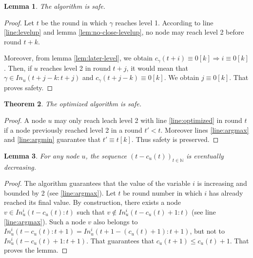 \documentclass[11pt,letterpaper]{article}
\renewcommand{\leq}{\leqslant}
\newtheorem{thm}{Theorem}
\newtheorem{lem}[thm]{Lemma}
\newcommand{\cent}{\gamma}
\begin{document}
\begin{lem}
	The algorithm is safe.
\end{lem}
\begin{proof}
	Let $t$ be the round in which $\cent$ reaches level 1.
	According to line \ref{line:levelup} and lemma \ref{lem:no-close-levelup}, no node may reach level 2 before round $t+k$.

	Moreover, from lemma \ref{lem:later-level}, we obtain $c_\cent(t+i) \equiv 0 [k] \Rightarrow i \equiv 0 [k]$.
	Then, if $u$ reaches level 2 in round $t+j$, it would mean that $\cent \in In_u(t+j-k:t+j)$ and $c_\cent(t+j-k) \equiv 0 [k]$.
	We obtain $j \equiv 0 [k]$. That proves safety.
\end{proof}

\begin{thm}
	The optimized algorithm is safe.
\end{thm}
\begin{proof}
	A node $u$ may only reach leach level 2 with line \ref{line:optimized} in round $t$ if a node previously reached level 2 in a round $t' < t$.
	Moreover lines \ref{line:argmax} and \ref{line:argmin} guarantee that $t' \equiv t [k]$.
	Thus safety is preserved.
\end{proof}

\begin{lem}
	For any node $u$, the sequence $(t-c_u(t))_{t \in \mathds{N}}$ is eventually decreasing.
\end{lem}
\begin{proof}
	The algorithm guarantees that the value of the variable $i$ is increasing and bounded by 2 (see \ref{line:argmax}).
	Let $t$ be round number in which $i$ has already reached its final value.
	By construction, there exists a node $v \in In_u^i(t-c_u(t):t)$ such that $v \notin In_u^i(t-c_u(t)+1:t)$ (see line \ref{line:argmax}).
	Such a node $v$ also belongs to $In_u^i(t-c_u(t):t+1) = In_u^i(t+1-(c_u(t)+1):t+1)$, but not to $In_u^i(t-c_u(t)+1:t+1)$.
	That guarantees that $c_u(t+1) \leq c_u(t)+1$.
	That proves the lemma.
\end{proof}
\end{document}
